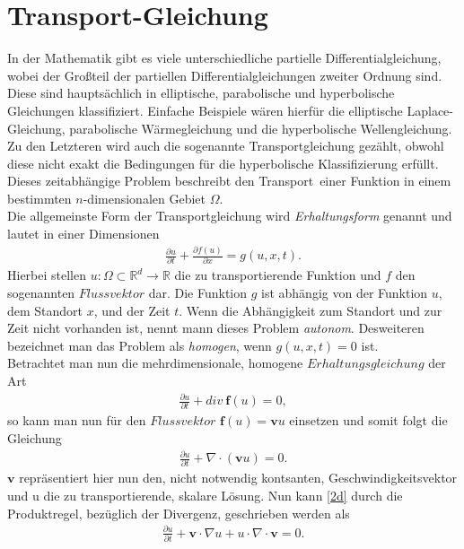 \documentclass[a4paper,11pt]{article}
\begin{document}
\section{Transport-Gleichung}\label{sec:transglei}
In der Mathematik gibt es viele unterschiedliche partielle Differentialgleichung, wobei der Großteil der partiellen Differentialgleichungen zweiter Ordnung sind. Diese sind hauptsächlich in elliptische, parabolische und hyperbolische Gleichungen klassifiziert. Einfache Beispiele wären hierfür die elliptische Laplace-Gleichung, parabolische Wärmegleichung und die hyperbolische Wellengleichung. Zu den Letzteren wird auch die sogenannte Transportgleichung gezählt, obwohl diese nicht exakt die Bedingungen für die hyperbolische Klassifizierung erfüllt. Dieses zeitabhängige Problem beschreibt den \grqq Transport\grqq~einer Funktion in einem bestimmten $n$-dimensionalen Gebiet $\Omega$.\\
Die allgemeinste Form der Transportgleichung wird \textit{Erhaltungsform} genannt und lautet in einer Dimensionen
\begin{align}
 \frac{\partial u}{\partial t}+\frac{\partial f(u)}{\partial x}=g(u,x,t)\label{1d}.
\end{align}
Hierbei stellen $u:\Omega\subset\mathbb{R}^d\to\mathbb{R}$ die zu transportierende Funktion und $f$ den sogenannten $Flussvektor$ dar. Die Funktion $g$ ist abhängig von der Funktion $u$, dem Standort $x$, und der Zeit $t$. Wenn die Abhängigkeit zum Standort und zur Zeit nicht vorhanden ist, nennt mann dieses Problem \textit{autonom}. Desweiteren bezeichnet man das Problem als \textit{homogen}, wenn $g(u,x,t)=0$ ist.\\
Betrachtet man nun die mehrdimensionale, homogene $Erhaltungsgleichung$ der Art
\begin{align}
 \frac{\partial u}{\partial t}+div~\textbf{f}(u)=0,
\end{align}
so kann man nun für den $Flussvektor$ $\textbf{f}(u)=\textbf{v} u$ einsetzen und somit folgt die Gleichung
\begin{align}
 \frac{\partial u}{\partial t}+\nabla \cdot (\textbf{v}u)=0.\label{2d}
\end{align}
$\textbf{v}$ repräsentiert hier nun den, nicht notwendig kontsanten, Geschwindigkeitsvektor und u die zu transportierende, skalare Lösung. Nun kann \eqref{2d} durch die Produktregel, bezüglich der Divergenz, geschrieben werden als
\begin{align}
  \frac{\partial u}{\partial t}+\textbf{v}\cdot\nabla u + u \cdot \nabla \cdot\textbf{v}=0.
\end{align}
\end{document}
